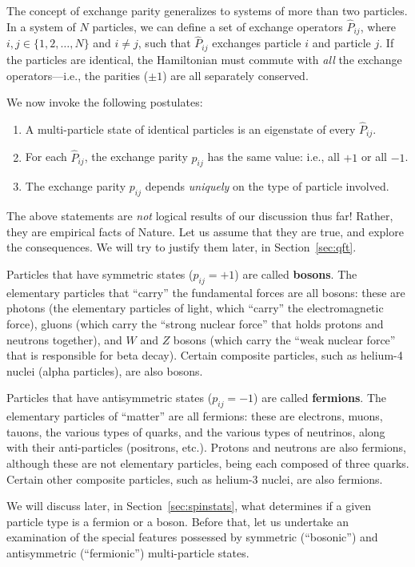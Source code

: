 \documentclass[pra,12pt]{revtex4}
\begin{document}
The concept of exchange parity generalizes to systems of more than two
particles.  In a system of $N$ particles, we can define a set of
exchange operators $\hat{P}_{ij}$, where $i,j\in\{1,2,\dots,N\}$ and
$i\ne j$, such that $\hat{P}_{ij}$ exchanges particle $i$ and particle
$j$.  If the particles are identical, the Hamiltonian must commute
with \textit{all} the exchange operators---i.e., the parities ($\pm
1$) are all separately conserved.

We now invoke the following postulates:
\begin{enumerate}
\item A multi-particle state of identical particles is an eigenstate
  of every $\hat{P}_{ij}$.

\item For each $\hat{P}_{ij}$, the exchange parity $p_{ij}$ has the
  same value: i.e., all $+1$ or all $-1$.

\item The exchange parity $p_{ij}$ depends \textit{uniquely} on the
  type of particle involved.
\end{enumerate}
The above statements are \textit{not} logical results of our
discussion thus far!  Rather, they are empirical facts of Nature.  Let
us assume that they are true, and explore the consequences.  We will
try to justify them later, in Section~\ref{sec:qft}.

Particles that have symmetric states ($p_{ij} = +1$) are called
\textbf{bosons}.  The elementary particles that ``carry'' the
fundamental forces are all bosons: these are photons (the elementary
particles of light, which ``carry'' the electromagnetic force), gluons
(which carry the ``strong nuclear force'' that holds protons and
neutrons together), and $W$ and $Z$ bosons (which carry the ``weak
nuclear force'' that is responsible for beta decay).  Certain
composite particles, such as helium-4 nuclei (alpha particles), are
also bosons.

Particles that have antisymmetric states ($p_{ij} = -1$) are called
\textbf{fermions}.  The elementary particles of ``matter'' are all
fermions: these are electrons, muons, tauons, the various types of
quarks, and the various types of neutrinos, along with their
anti-particles (positrons, etc.).  Protons and neutrons are also
fermions, although these are not elementary particles, being each
composed of three quarks.  Certain other composite particles, such as
helium-3 nuclei, are also fermions.

We will discuss later, in Section~\ref{sec:spinstats}, what determines
if a given particle type is a fermion or a boson.  Before that, let us
undertake an examination of the special features possessed by
symmetric (``bosonic'') and antisymmetric (``fermionic'')
multi-particle states.
\end{document}

